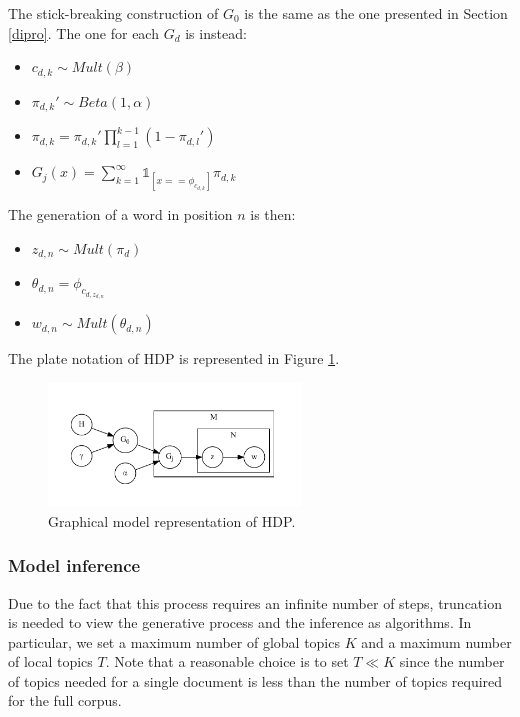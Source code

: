 The stick-breaking construction of $G_0$ is the same as the one presented in Section \ref{dipro}.
The one for each $G_d$ is instead:
\begin{itemize}
    \item $c_{d,k} \sim \mathit{Mult}(\beta)$
    \item $\pi_{d,k}' \sim \mathit{Beta(1, \alpha)}$
    \item $\pi_{d,k} = \pi_{d,k}' \prod_{l=1}^{k-1} (1 - \pi_{d,l}')$
    \item $G_j(x) = \sum_{k=1}^{\infty} \mathbb{1}_{[x == \phi_{c_{d,k}}]} \pi_{d,k}$
\end{itemize}

The generation of a word in position $n$ is then:
\begin{itemize}
    \item $z_{d,n} \sim \mathit{Mult}(\pi_d)$
    \item $\theta_{d,n} = \phi_{c_{d,z_{d,n}}}$
    \item $w_{d,n} \sim \mathit{Mult}(\theta_{d,n})$
\end{itemize}

The plate notation of HDP is represented in Figure \ref{fig:hdp}.

\begin{figure}[ht]
    \centering
    \includegraphics[width=0.6\textwidth]{images/hdp.pdf}
    \caption{Graphical model representation of HDP.}
    \label{fig:hdp}
\end{figure}

\subsubsection{Model inference}
Due to the fact that this process requires an infinite number of steps,
truncation is needed to view the generative process and the inference as algorithms.
In particular, we set a maximum number of global topics $K$ and a maximum number of local topics $T$.
Note that a reasonable choice is to set $T \ll K$ since the number of topics needed for a single document is
less than the number of topics required for the full corpus.

